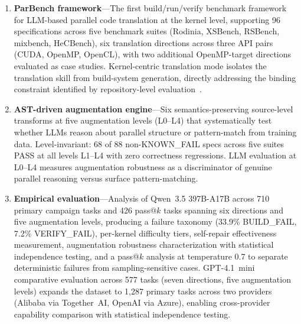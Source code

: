 \documentclass[conference]{IEEEtran}
\begin{document}
\begin{enumerate}
\item \textbf{ParBench framework}---The first build/run/verify benchmark framework for LLM-based parallel code translation at the kernel level, supporting 96 specifications across five benchmark suites (Rodinia, XSBench, RSBench, mixbench, HeCBench), six translation directions across three API pairs (CUDA, OpenMP, OpenCL), with two additional OpenMP-target directions evaluated as case studies. Kernel-centric translation mode isolates the translation skill from build-system generation, directly addressing the binding constraint identified by repository-level evaluation~\cite{ParEvalRepo2025}.

\item \textbf{AST-driven augmentation engine}---Six semantics-preserving source-level transforms at five augmentation levels (L0--L4) that systematically test whether LLMs reason about parallel structure or pattern-match from training data. Level-invariant: 68 of 88 non-KNOWN\_FAIL specs across five suites PASS at all levels L1--L4 with zero correctness regressions. LLM evaluation at L0--L4 measures augmentation robustness as a discriminator of genuine parallel reasoning versus surface pattern-matching.

\item \textbf{Empirical evaluation}---Analysis of Qwen~3.5 397B-A17B across 710 primary campaign tasks and 426 pass@$k$ tasks spanning six directions and five augmentation levels, producing a failure taxonomy (33.9\% BUILD\_FAIL, 7.2\% VERIFY\_FAIL), per-kernel difficulty tiers, self-repair effectiveness measurement, augmentation robustness characterization with statistical independence testing, and a pass@$k$ analysis at temperature 0.7 to separate deterministic failures from sampling-sensitive cases. GPT-4.1~mini comparative evaluation across 577 tasks (seven directions, five augmentation levels) expands the dataset to 1{,}287 primary tasks across two providers (Alibaba via Together~AI, OpenAI via Azure), enabling cross-provider capability comparison with statistical independence testing. %
\end{enumerate}

\end{document}
